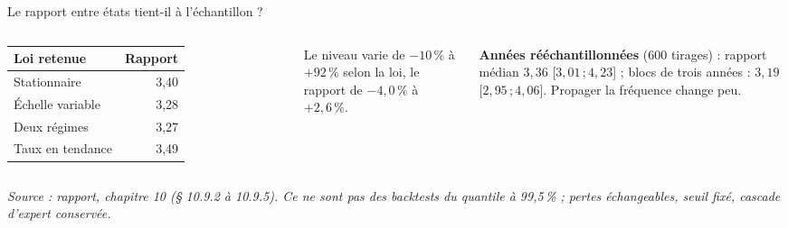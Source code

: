 \documentclass[aspectratio=169,10pt,t]{beamer}
\newcommand{\source}[1]{\par\vfill{\tiny\color{gris}\textit{Source : #1}}\par\vspace{-1mm}}
\renewcommand{\arraystretch}{1.25}
\begin{document}
\begin{frame}{Le rapport entre états tient-il à l'échantillon ?}
\begin{columns}[T,onlytextwidth]
    \renewcommand{\arraystretch}{1.1}
    \begin{tabular}{@{}l r@{}}
      \toprule
      Loi retenue & Rapport \\
      \midrule
      Stationnaire & 3,40 \\
      Échelle variable & 3,28 \\
      Deux régimes & 3,27 \\
      Taux en tendance & 3,49 \\
      \bottomrule
    \end{tabular}\par\vspace{1mm}
    Le niveau varie de $-10\,\%$ à $+92\,\%$ selon la loi, le rapport de $-4{,}0\,\%$ à $+2{,}6\,\%$.\par\vspace{1mm}
    \textbf{Années rééchantillonnées} (600 tirages) : rapport médian $3{,}36$ [$3{,}01\,;4{,}23$] ; blocs de trois années : $3{,}19$ [$2{,}95\,;4{,}06$]. Propager la fréquence change peu.
  \end{columns}
  \source{rapport, chapitre 10 (§ 10.9.2 à 10.9.5). Ce ne sont pas des backtests du quantile à 99,5\,\% ; pertes échangeables, seuil fixé, cascade d'expert conservée.}
\end{frame}
\end{document}
